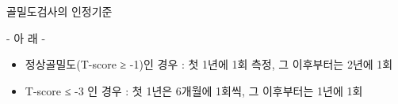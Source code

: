 \begin{commentbox}{골밀도검사의 인정기준}
\begin{enumerate}[가.]
\begin{enumerate}[(1)]
\begin{enumerate}[(가)]
- 아 래 -
			\begin{itemize}\tightlist
			\item 정상골밀도(T-score ≥ -1)인 경우 : 첫 1년에 1회 측정, 그 이후부터는 2년에 1회
			\item T-score ≤ -3 인 경우 : 첫 1년은 6개월에 1회씩, 그 이후부터는 1년에 1회
			\end{itemize}
		\end{enumerate}
	\end{enumerate}
\end{enumerate}
\end{commentbox}

